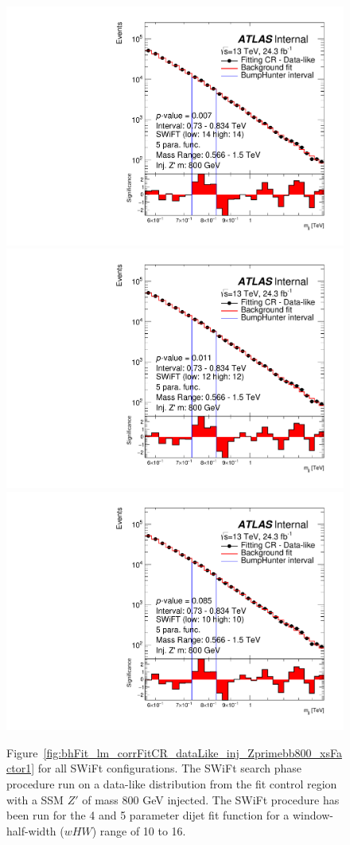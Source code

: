 \begin{figure}[!htb]
{}
 {
  \includegraphics[width=0.3\linewidth, angle=0]{figs/Dibjet/LowMass/FitStudy_min566/bhFit_corrFitCR_dataLike_5para_low14_high14_inj_Zprimebb800_xsFactor1.pdf}
}\\
 {
  \includegraphics[width=0.3\linewidth, angle=0]{figs/Dibjet/LowMass/FitStudy_min566/bhFit_corrFitCR_dataLike_5para_low12_high12_inj_Zprimebb800_xsFactor1.pdf}
}
 {
  \includegraphics[width=0.3\linewidth, angle=0]{figs/Dibjet/LowMass/FitStudy_min566/bhFit_corrFitCR_dataLike_5para_low10_high10_inj_Zprimebb800_xsFactor1.pdf}
}
\vspace{10pt}
\caption[Figure~\ref{fig:bhFit_lm_corrFitCR_dataLike_inj_Zprimebb800_xsFactor1} for all SWiFt configurations.]
{\label{fig:app-bhFit_lm_corrFitCR_dataLike_inj_Zprimebb800_xsFactor1}
Figure~\ref{fig:bhFit_lm_corrFitCR_dataLike_inj_Zprimebb800_xsFactor1} for all SWiFt configurations.    
  The SWiFt search phase procedure run on a data-like distribution
  from the fit control region with a SSM $Z'$ of mass 800 GeV injected.
  The SWiFt procedure has been run for the 4 and 5 parameter dijet fit function for a window-half-width ($wHW$) range of 10 to 16.
}
\end{figure}




